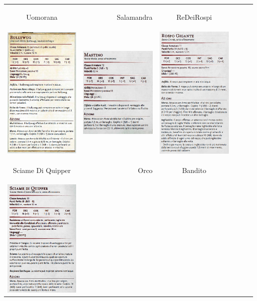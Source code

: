 \documentclass{article}
\begin{document}
\begin{table}
\begin{tabular}{|cr cr cr|}
        \\
        \hypertarget{uomorana}{Uomorana} & Salamandra & \hypertarget{re}{ReDeiRospi}\\
        \includegraphics[width=4cm, height = 6 cm]{../Mostri/Bullywug.PNG} &  \includegraphics[width=4cm, height = 6 cm]{../Mostri/Mastino.PNG}&
        \includegraphics[width=4cm, height = 6 cm]{../Mostri/ReDeiRospi.PNG}\\
        \hypertarget{sciame}{Sciame Di Quipper} & \hypertarget{orco}{Orco} &  \hypertarget{bandito}{Bandito} \\
        \includegraphics[width=4cm, height = 6 cm]{../Mostri/Sciame di Quippers.PNG} &  

\end{tabular}
\end{table}
\end{document}
